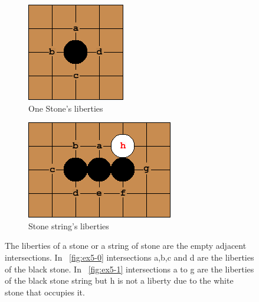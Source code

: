 \documentclass{l4proj}
\begin{document}
\begin{figure}[!ht]
\centering
\begin{subfigure}[b]{0.25\textwidth}
\includegraphics[width=\textwidth]{ex/Ex5-0.png}
\caption{One Stone's liberties}
\label{fig:ex5-0}
\end{subfigure}\qquad
\begin{subfigure}[b]{0.375\textwidth}
\includegraphics[width=\textwidth]{ex/Ex5-1.png}
\caption{Stone string's liberties}
\label{fig:ex5-1}
\end{subfigure}
\caption{The liberties of a stone or a string of stone are the empty adjacent intersections.  In ~\autoref{fig:ex5-0} intersections a,b,c and d are the liberties of the black stone.
In ~\autoref{fig:ex5-1} intersections a to g are the liberties of the black stone string but h is not a liberty due to the white stone that occupies it.}
\label{fig:ex5}
\end{figure}
\end{document}
